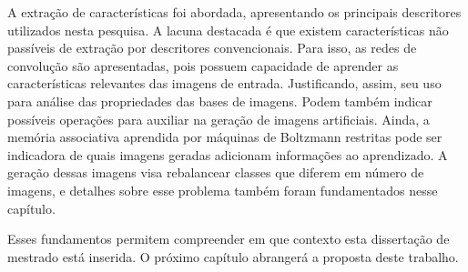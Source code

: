 A extração de características foi abordada, apresentando os principais descritores utilizados nesta pesquisa. A lacuna destacada é que existem características não passíveis de extração por descritores convencionais. Para isso, as redes de convolução são apresentadas, pois possuem capacidade de aprender as características relevantes das imagens de entrada. Justificando, assim, seu uso para análise das propriedades das bases de imagens. Podem também indicar possíveis operações para auxiliar na geração de imagens artificiais. Ainda, a memória associativa aprendida por máquinas de Boltzmann restritas pode ser indicadora de quais imagens geradas adicionam informações ao aprendizado. A geração dessas imagens visa rebalancear classes que diferem em número de imagens, e detalhes sobre esse problema também foram fundamentados nesse capítulo.

Esses fundamentos permitem compreender em que contexto esta dissertação de mestrado está inserida. O próximo capítulo abrangerá a proposta deste trabalho.
